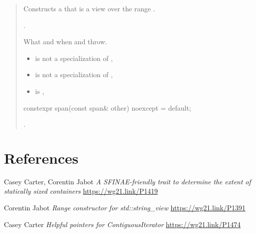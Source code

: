 \documentclass{wg21}
\begin{document}
\begin{quote}
\begin{addedblock}
\begin{itemdescr}
	\pnum
	\effects
	Constructs a  that is a view over the range .

	\pnum
	\ensures
	.

	\pnum
	\throws
	What and when  and  throw.

	\pnum
	\constraints
	\begin{itemize}
		\item {} is not a specialization of ,
		\item {} is not a specialization of ,
		\item {} is ,
	\end{itemize}
\end{itemdescr}
\end{addedblock}

\begin{itemdecl}
constexpr span(const span& other) noexcept = default;
\end{itemdecl}
\begin{itemdescr}
	\pnum
	\ensures
	.
\end{itemdescr}


\end{quote}

\section{References}
\renewcommand{\section}[2]{}%
\begin{thebibliography}{9}
	
	Casey Carter, Corentin Jabot
	\emph{A SFINAE-friendly trait to determine the extent of statically sized containers}\newline
	\url{https://wg21.link/P1419}
	
	Corentin Jabot
	\emph{Range constructor for std::string\_view}\newline
	\url{https://wg21.link/P1391}
	
	
	Casey Carter
	\emph{Helpful pointers for ContiguousIterator}\newline
	\url{https://wg21.link/P1474}
	
	
	
\end{thebibliography}
\end{document}
